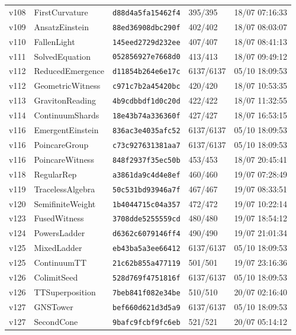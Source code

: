 \documentclass[11pt]{article}
\theoremstyle{definition}\newtheorem{deriv}{Derivação}
\begin{document}
{\begin{longtable}{@{}lllll@{}}
v108 & FirstCurvature & \texttt{d88d4a5fa15462f4} & 395/395 & 18/07 07:16:33 \\
v109 & AnsatzEinstein & \texttt{88ed36908dbc290f} & 402/402 & 18/07 08:03:07 \\
v110 & FallenLight & \texttt{145eed2729d232ee} & 407/407 & 18/07 08:41:13 \\
v111 & SolvedEquation & \texttt{052856927e7668d0} & 413/413 & 18/07 09:49:12 \\
v112 & ReducedEmergence & \texttt{d11854b264e6e17c} & 6137/6137 & 05/10 18:09:53 \\
v112 & GeometricWitness & \texttt{c971c7b2a45420bc} & 420/420 & 18/07 10:53:35 \\
v113 & GravitonReading & \texttt{4b9cdbbdf1d0c20d} & 422/422 & 18/07 11:32:55 \\
v114 & ContinuumShards & \texttt{18e43b74a336360f} & 427/427 & 18/07 16:53:15 \\
v116 & EmergentEinstein & \texttt{836ac3e4035afc52} & 6137/6137 & 05/10 18:09:53 \\
v116 & PoincareGroup & \texttt{c73c927631381aa7} & 6137/6137 & 05/10 18:09:53 \\
v116 & PoincareWitness & \texttt{848f2937f35ec50b} & 453/453 & 18/07 20:45:41 \\
v118 & RegularRep & \texttt{a3861da9c4d4e8ef} & 460/460 & 19/07 07:28:49 \\
v119 & TracelessAlgebra & \texttt{50c531bd93946a7f} & 467/467 & 19/07 08:33:51 \\
v120 & SemifiniteWeight & \texttt{1b4044715c04a357} & 472/472 & 19/07 10:22:14 \\
v123 & FusedWitness & \texttt{3708dde5255559cd} & 480/480 & 19/07 18:54:12 \\
v124 & PowersLadder & \texttt{d6362c6079146ff4} & 490/490 & 19/07 21:01:34 \\
v125 & MixedLadder & \texttt{eb43ba5a3ee66412} & 6137/6137 & 05/10 18:09:53 \\
v125 & ContinuumTT & \texttt{21c62b855a477119} & 501/501 & 19/07 23:16:36 \\
v126 & ColimitSeed & \texttt{528d769f4751816f} & 6137/6137 & 05/10 18:09:53 \\
v126 & TTSuperposition & \texttt{7beb841f082e34be} & 510/510 & 20/07 02:16:40 \\
v127 & GNSTower & \texttt{bef660d621d3d5a9} & 6137/6137 & 05/10 18:09:53 \\
v127 & SecondCone & \texttt{9bafc9fcbf9fc6eb} & 521/521 & 20/07 05:14:12 \\

\end{longtable}}
\end{document}

